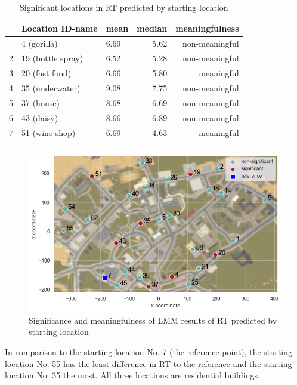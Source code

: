 \begin{table}[h]
	\begin{center}
		\caption[Significant locations in RT predicted by starting location]{Significant locations in RT predicted by starting location}
		\vspace{10pt}
		\begin{tabular}{l l l r r} 
			\hiderowcolors
			\hline \hline
			{} & \setrow{\bfseries} Location ID-name & \setrow{\bfseries} mean & \setrow{\bfseries} median & \setrow{\bfseries} meaningfulness \\ [.7ex] 
			\hline\hline
			\showrowcolors
			1 & 4 (gorilla)		& 		6.69 &  	5.62	& non-meaningful	  \\ 
			\hline
			2 & 19 (bottle spray)		& 		6.52 & 5.28	 	& non-meaningful 	  \\
			3 & 20 (fast food) 			& 6.66 &	5.80	& meaningful  \\
			4 & 35 (underwater) 	& 	9.08 & 7.75		& non-meaningful	  \\
			5 & 37 (house) 		& 		8.68 & 6.69 		& non-meaningful  \\ 
			6 & 43 (daisy)		& 		8.66 	& 6.89	& non-meaningful  \\ 
			7 & 51 (wine shop)		& 		6.69 & 4.63 & meaningful  \\ 
			[1ex]
			\hline \hline
			\hiderowcolors
		\end{tabular}
		\label{tab:sig_RT_loc}
	\end{center}
\end{table}

\begin{figure}[!htb]
	\centering
	\includegraphics[width=150mm]{figures/significance_starting_locations_RT_map_23.png}
	\caption[Significance and meaningfulness (RT predicted by starting location)]{Significance and meaningfulness of LMM results of RT predicted by starting location}
	\label{fig:sig_RT_loc_map}
\end{figure}

In comparison to the starting location No. 7 (the reference point), the starting location No. 55 has the least difference in RT to the reference and the starting location No. 35 the most. All three locations are residential buildings.

